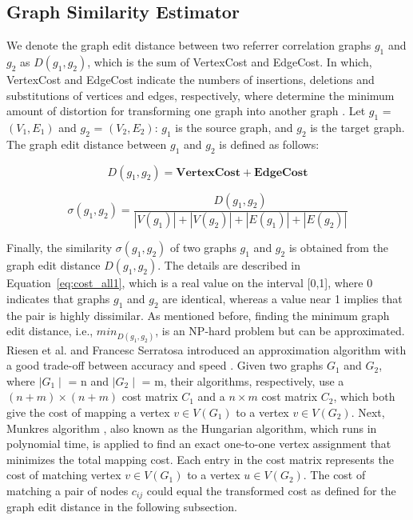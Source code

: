 \subsection{Graph Similarity Estimator}

We denote the graph edit distance between two referrer correlation graphs $g_{1}$ and $g_{2}$ as $D(g_{1}, g_{2})$, which is the sum of VertexCost and EdgeCost. In which, VertexCost and EdgeCost indicate the numbers of insertions, deletions and substitutions of vertices and edges, respectively, where determine the minimum amount of distortion for transforming one graph into another graph  \cite{p:Fankhauser11}. Let $g_{1}$ = $(V_{1}, E_{1})$  and $g_{2}$ = $(V_{2}, E_{2})$: $g_{1}$ is the source graph, and $g_{2}$ is the target graph. The graph edit distance between $g_{1}$ and $g_{2}$ is defined as follows:

\begin{equation}
        \label{eq:ged}
        D(g_{1}, g_{2}) = \mathbf{VertexCost} + \mathbf{EdgeCost}
\end{equation}

\begin{equation}
        \label{eq:cost_all1}
\sigma (g_{1},g_{2}) = \frac{D(g_{1}, g_{2})}{\left | V(g_{1}) \right | + \left | V(g_{2}) \right | +\left | E(g_{1}) \right | + \left | E(g_{2}) \right |}
\end{equation}

Finally, the similarity $\sigma (g_{1},g_{2}) $ of two graphs $g_{1}$ and $g_{2}$ is obtained from the graph edit distance $D(g_{1}, g_{2})$. The details are described in Equation~\ref{eq:cost_all1}, which is a real value on the interval [0,1], where 0 indicates that graphs $g_{1}$ and $g_{2}$ are identical, whereas a value near 1 implies that the pair is highly dissimilar. As mentioned before, finding the minimum graph edit distance, i.e., $min_{D(g_{1}, g_{2})}$, is an NP-hard problem but can be approximated. Riesen et al. and  Francesc Serratosa introduced an approximation algorithm with a good trade-off between accuracy and speed \cite{p:Riesen09} \cite{p:Serratosa14}. Given two graphs $G_{1}$ and $G_{2}$, where $\mid G_{1}\mid$ = n and $\mid G_{2}\mid$ = m, their algorithms, respectively, use a $(n+m) \times (n+m)$ cost matrix $C_{1}$ and a $n \times m$ cost matrix $C_{2}$, which both give the cost of mapping a vertex $v \in V(G_{1})$ to a vertex $v \in V(G_{2})$. Next,  Munkres algorithm \cite{p:Munkres57}, also known as the Hungarian algorithm, which runs in polynomial time, is applied to find an exact one-to-one vertex assignment  that minimizes the total mapping cost. Each entry in the cost matrix represents the cost of matching vertex $v \in V(G_{1})$ to a vertex $u \in V(G_{2})$. The cost of matching a pair of nodes $c_{ij}$ could equal the transformed cost as defined for the graph edit distance in the following subsection.

